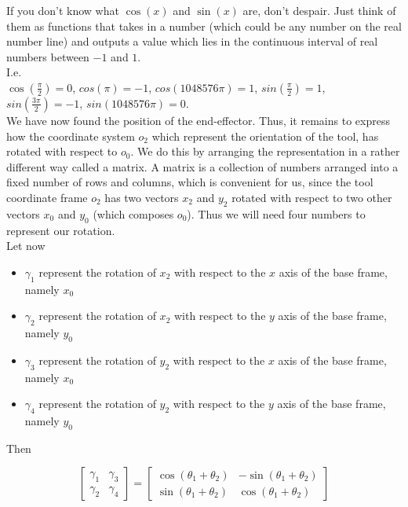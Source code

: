 	If you don't know what $\cos(x)$ and $\sin(x)$ are, don't despair. Just think of them as functions that takes in a number (which could be any number on the real number line) and outputs a value which lies in the continuous interval of real numbers between $-1$ and $1$.\\
	I.e.\\ $\cos(\frac{\pi}{2}) = 0$, $cos(\pi) = -1$, $cos(1048576\pi) = 1$, $sin(\frac{\pi}{2}) = 1$, $sin(\frac{3\pi}{2}) = -1$, $sin(1048576\pi) = 0$.\\

	We have now found the position of the end-effector. Thus, it remains to express how the coordinate system $o_2$ which represent the orientation of the tool, has rotated with respect to $o_0$.
	We do this by arranging the representation in a rather different way called a matrix. A matrix is a collection of numbers arranged into a fixed number of rows and columns, which is convenient for us, since the tool coordinate frame $o_2$ has two vectors $x_{2}$ and $y_{2}$ rotated with respect to two other vectors $x_{0}$ and $y_{0}$ (which composes $o_0$). Thus we will need four numbers to represent our rotation.\\


	Let now

	\begin{itemize}

		\item $\gamma_1$ represent the rotation of $x_{2}$ with respect to the $x$ axis of the base frame, namely $x_{0}$
		\item $\gamma_2$ represent the rotation of $x_{2}$ with respect to the $y$ axis of the base frame, namely $y_{0}$
		\item $\gamma_3$ represent the rotation of $y_{2}$ with respect to the $x$ axis of the base frame, namely $x_{0}$
		\item $\gamma_4$ represent the rotation of $y_{2}$ with respect to the $y$ axis of the base frame, namely $y_{0}$

	\end{itemize}

	Then


	\begin{equation} \label{eq:orientation}
		\begin{bmatrix}
			\gamma_1 & \gamma_3 \\
			\gamma_2 & \gamma_4
		\end{bmatrix}
		=
		\begin{bmatrix}
			\cos(\theta_{1} + \theta_{2}) & -\sin(\theta_{1} + \theta_{2}) \\
			\sin(\theta_{1} + \theta_{2}) & \cos(\theta_{1} + \theta_{2})
		\end{bmatrix}
	\end{equation}

